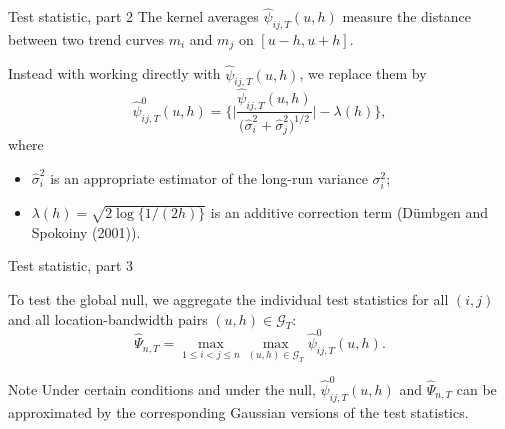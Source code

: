\documentclass[10pt]{beamer}
\begin{document}
\begin{frame}[label = frame_teststatistic]{Test statistic, part 2}
The kernel averages $\widehat{\psi}_{ij, T}(u,h)$ measure the distance between two trend curves $m_i$ and $m_j$ on $[u - h, u + h]$. \pause

Instead with working directly with $\widehat{\psi}_{ij, T}(u,h)$, we replace them by
\begin{equation*}
\widehat{\psi}^0_{ij, T}(u,h) = \bigg\{ \bigg|\frac{\widehat{\psi}_{ij, T}(u,h)}{\big(\widehat{\sigma}_i^2 + \widehat{\sigma}_j^2\big)^{1/2}}\bigg| - \lambda(h) \bigg\}, 
\end{equation*}\pause
\vspace{-3mm}
where 
\begin{itemize}
\item $\widehat{\sigma}_i^2$ is an appropriate estimator of the long-run variance $\sigma^2_i$;
\item $\lambda(h) = \sqrt{2 \log \{ 1/(2h) \}}$ is an additive correction term (D{\"u}mbgen and Spokoiny (2001)). %
\end{itemize}
\end{frame}

\begin{frame}{Test statistic, part 3}

To test the global null, we aggregate the individual test statistics \linebreak for all $(i, j)$ and all location-bandwidth pairs $(u, h) \in \mathcal{G}_T$:
\begin{equation*}
\widehat{\Psi}_{n, T} = \max_{1 \leq i < j \leq n} \max_{(u,h) \in \mathcal{G}_T} \widehat{\psi}^0_{ij, T}(u,h). 
\end{equation*}\pause
\vspace{-3mm}
\begin{block}{Note}
Under certain conditions and under the null, $\widehat{\psi}^0_{ij, T}(u,h)$ and $\widehat{\Psi}_{n, T}$ can be approximated by the corresponding Gaussian versions of the test statistics.
\end{block}
\end{frame}
\end{document}
